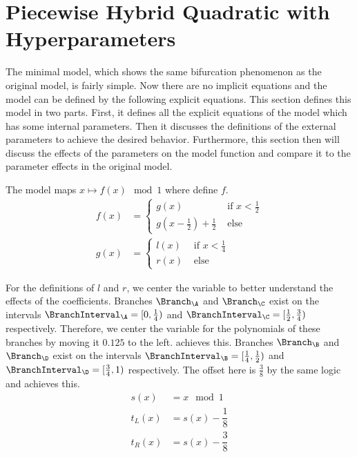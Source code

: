 \section{Piecewise Hybrid Quadratic with Hyperparameters}
\label{sec:setup.pw.hybrid.quad}

The minimal model, which shows the same bifurcation phenomenon as the original model, is fairly simple.
Now there are no implicit equations and the model can be defined by the following explicit equations.
This section defines this model in two parts.
First, it defines all the explicit equations of the model which has some internal parameters.
Then it discusses the definitions of the external parameters to achieve the desired behavior.
Furthermore, this section then will discuss the effects of the parameters on the model function and compare it to the parameter effects in the original model.

The model maps $x \mapsto f(x) \mod 1$ where  define $f$.
\begin{align}
	f(x) & = \begin{cases}
		         g(x)                                        & \text{ if } x < \frac{1}{2} \\
		         g\left(x - \frac{1}{2}\right) + \frac{1}{2} & \text{ else}
	         \end{cases}
	\label{equ:final.def.f}
	\\
	g(x) & = \begin{cases}
		         l(x) & \text{ if } x < \frac{1}{4} \\
		         r(x) & \text{ else}
	         \end{cases}
\end{align}

For the definitions of $l$ and $r$, we center the variable to better understand the effects of the coefficients.
Branches $\Branch_\A$ and $\Branch_\C$ exist on the intervals $\BranchInterval_\A = [0, \frac{1}{4})$ and $\BranchInterval_\C = [\frac{1}{2}, \frac{3}{4})$ respectively.
Therefore, we center the variable for the polynomials of these branches by moving it $0.125$ to the left.
 achieves this.
Branches $\Branch_\B$ and $\Branch_\D$ exist on the intervals $\BranchInterval_\B = [\frac{1}{4}, \frac{1}{2})$ and $\BranchInterval_\D = [\frac{3}{4}, 1)$ respectively.
The offset here is $\frac{3}{8}$ by the same logic and  achieves this.
\begin{align}
	s(x)   & = x \mod 1                                     \\
	t_L(x) & = s(x) - \dfrac{1}{8} \label{equ:final.def.tl} \\
	t_R(x) & = s(x) - \dfrac{3}{8} \label{equ:final.def.tr}
\end{align}

